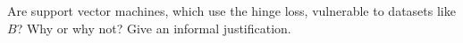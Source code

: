 \item {} Are support vector machines, which use the hinge
loss, vulnerable to datasets like $B$? Why or why not? Give an informal
justification.

\ifnum{} {
  
} \fi

